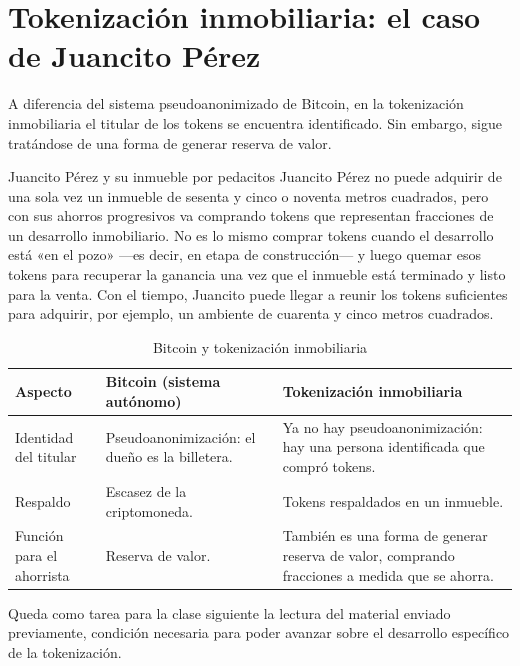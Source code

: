 \documentclass[12pt,oneside]{book}
\begin{document}
\section{Tokenización inmobiliaria: el caso de Juancito Pérez}

A diferencia del sistema pseudoanonimizado de Bitcoin, en la tokenización inmobiliaria el titular de los tokens se encuentra identificado. Sin embargo, sigue tratándose de una forma de generar reserva de valor.

\begin{example}{Juancito Pérez y su inmueble por pedacitos}
Juancito Pérez no puede adquirir de una sola vez un inmueble de sesenta y cinco o noventa metros cuadrados, pero con sus ahorros progresivos va comprando tokens que representan fracciones de un desarrollo inmobiliario. No es lo mismo comprar tokens cuando el desarrollo está «en el pozo» —es decir, en etapa de construcción— y luego quemar esos tokens para recuperar la ganancia una vez que el inmueble está terminado y listo para la venta. Con el tiempo, Juancito puede llegar a reunir los tokens suficientes para adquirir, por ejemplo, un ambiente de cuarenta y cinco metros cuadrados.
\end{example}

\begin{table}[H]
\centering
\caption{Bitcoin y tokenización inmobiliaria}
\begin{tabular}{p{}p{}p{}}
\toprule
\textbf{Aspecto} & \textbf{Bitcoin (sistema autónomo)} & \textbf{Tokenización inmobiliaria} \\
\midrule
Identidad del titular & Pseudoanonimización: el dueño es la billetera. & Ya no hay pseudoanonimización: hay una persona identificada que compró tokens. \\
Respaldo & Escasez de la criptomoneda. & Tokens respaldados en un inmueble. \\
Función para el ahorrista & Reserva de valor. & También es una forma de generar reserva de valor, comprando fracciones a medida que se ahorra. \\
\bottomrule
\end{tabular}
\end{table}

\begin{note}
Queda como tarea para la clase siguiente la lectura del material enviado previamente, condición necesaria para poder avanzar sobre el desarrollo específico de la tokenización.
\end{note}
\end{document}
